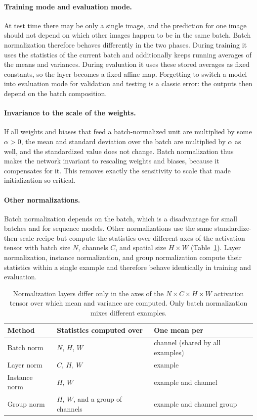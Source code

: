 \paragraph{Training mode and evaluation mode.}
At test time there may be only a single image, and the prediction for one image
should not depend on which other images happen to be in the same batch. Batch
normalization therefore behaves differently in the two phases. During training
it uses the statistics of the current batch and additionally keeps running
averages of the means and variances. During evaluation it uses these stored
averages as fixed constants, so the layer becomes a fixed affine map. Forgetting
to switch a model into evaluation mode for validation and testing is a classic
error: the outputs then depend on the batch composition.

\paragraph{Invariance to the scale of the weights.}
If all weights and biases that feed a batch-normalized unit are multiplied by
some $\alpha > 0$, the mean and standard deviation over the batch are multiplied
by $\alpha$ as well, and the standardized value does not change. Batch
normalization thus makes the network invariant to rescaling weights and biases,
because it compensates for it. This removes exactly the sensitivity to scale
that made initialization so critical.

\paragraph{Other normalizations.}
Batch normalization depends on the batch, which is a disadvantage for small
batches and for sequence models. Other normalizations use the same
standardize-then-scale recipe but compute the statistics over different axes of
the activation tensor with batch size $N$, channels $C$, and spatial size
$H\times W$ (Table~\ref{tab:norm-variants}). Layer normalization, instance
normalization, and group normalization compute their statistics within a single
example and therefore behave identically in training and evaluation.

\begin{table}[ht]
  \centering
  \begin{tabular}{@{}p{2.8cm}p{5.6cm}p{5.6cm}@{}}
    \toprule
    Method & Statistics computed over & One mean per \\
    \midrule
    Batch norm & $N$, $H$, $W$ & channel (shared by all examples) \\
    Layer norm & $C$, $H$, $W$ & example \\
    Instance norm & $H$, $W$ & example and channel \\
    Group norm & $H$, $W$, and a group of channels & example and channel group \\
    \bottomrule
  \end{tabular}
  \caption{Normalization layers differ only in the axes of the $N\times C\times
  H\times W$ activation tensor over which mean and variance are computed. Only
  batch normalization mixes different examples.}
  \label{tab:norm-variants}
\end{table}

